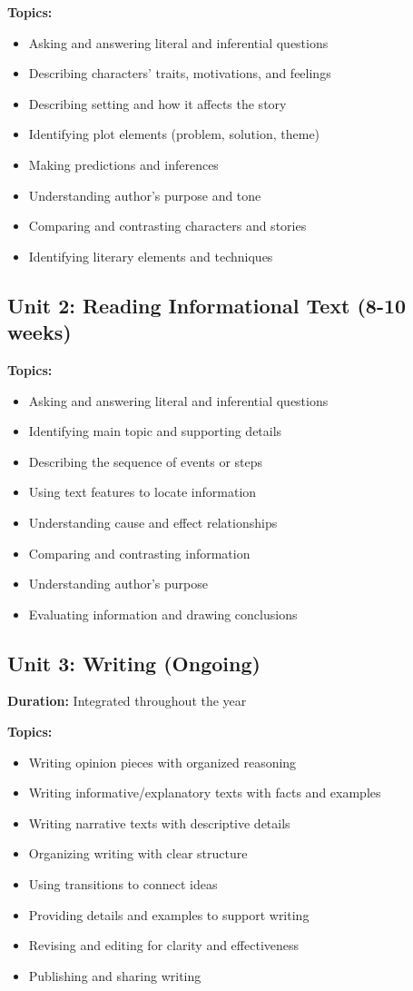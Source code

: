 \documentclass[11pt,letterpaper]{report}
\begin{document}
\textbf{Topics:}
\begin{itemize}
    \item Asking and answering literal and inferential questions
    \item Describing characters' traits, motivations, and feelings
    \item Describing setting and how it affects the story
    \item Identifying plot elements (problem, solution, theme)
    \item Making predictions and inferences
    \item Understanding author's purpose and tone
    \item Comparing and contrasting characters and stories
    \item Identifying literary elements and techniques
\end{itemize}

\subsection{Unit 2: Reading Informational Text (8-10 weeks)}

\textbf{Topics:}
\begin{itemize}
    \item Asking and answering literal and inferential questions
    \item Identifying main topic and supporting details
    \item Describing the sequence of events or steps
    \item Using text features to locate information
    \item Understanding cause and effect relationships
    \item Comparing and contrasting information
    \item Understanding author's purpose
    \item Evaluating information and drawing conclusions
\end{itemize}

\subsection{Unit 3: Writing (Ongoing)}

\textbf{Duration:} Integrated throughout the year

\textbf{Topics:}
\begin{itemize}
    \item Writing opinion pieces with organized reasoning
    \item Writing informative/explanatory texts with facts and examples
    \item Writing narrative texts with descriptive details
    \item Organizing writing with clear structure
    \item Using transitions to connect ideas
    \item Providing details and examples to support writing
    \item Revising and editing for clarity and effectiveness
    \item Publishing and sharing writing
\end{itemize}
\end{document}
